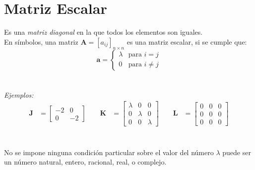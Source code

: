 \documentclass[a4paper,12pt]{report} %
\begin{document}
\section{Matriz Escalar}
Es una \textit{matriz diagonal} en la que todos los elementos son iguales.\\
En símbolos, una matriz \(\mathbf{A} = \left[\mathit{a_{ij}}\right]_\mathit{n\times n}\) es una matriz escalar, si se cumple que:
\vspace{0.5cm}
\[
\mathbf{a} = \begin{cases}
    \lambda & \text{para } \mathit{i = j} \\
    0 & \text{para } \mathit{i\neq j}
    \end{cases}
\]
\\ \\
\textit{Ejemplos:} \\ 
\[
\begin{aligned}
\mathbf{J} &= \begin{bmatrix}
    -2 & 0 \\
    0 & -2
\end{bmatrix}
\qquad
\mathbf{K} &= \begin{bmatrix}
    \lambda  & 0 & 0 \\
    0 & \lambda & 0 \\
    0 & 0 & \lambda
\end{bmatrix}
\qquad
\mathbf{L} &= \begin{bmatrix}
    0 & 0 & 0 \\
    0 & 0 & 0 \\
    0 & 0 & 0
\end{bmatrix}
\end{aligned}
\]
\\ \\
No se impone ninguna condición particular sobre el valor del número \(\lambda\) puede ser un número natural, entero, racional, real, o complejo.
\\

\end{document}
